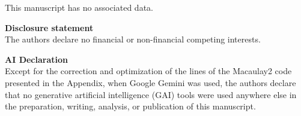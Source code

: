 \documentclass[11pt]{amsart}   %
\begin{document}
This manuscript has no associated data.

\bigskip

\noindent\textbf{Disclosure statement}\\

The authors declare no financial or non-financial competing interests.

\bigskip

\noindent\textbf{AI Declaration}\\

Except for the correction and optimization of the lines of the Macaulay2 code presented in the Appendix, when Google Gemini was used, the authors declare that no generative artificial intelligence (GAI) tools were used anywhere else in the preparation, writing, analysis, or publication of this manuscript.
\end{document}
